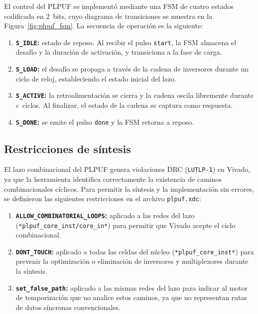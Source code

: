 El control del PLPUF se implementó mediante una FSM de cuatro estados
codificada en 2~bits, cuyo diagrama de transiciones se muestra en la
Figura~\ref{fig:plpuf_fsm}. La secuencia de operación es la siguiente:

\begin{enumerate}
  \item \textbf{\texttt{S\_IDLE}:} estado de reposo. Al recibir el pulso
    \texttt{start}, la FSM almacena el desafío y la duración de activación, y
    transiciona a la fase de carga.

  \item \textbf{\texttt{S\_LOAD}:} el desafío se propaga a través de la
    cadena de inversores durante un ciclo de reloj, estableciendo el estado
    inicial del lazo.

  \item \textbf{\texttt{S\_ACTIVE}:} la retroalimentación se cierra y la
    cadena oscila libremente durante $c$~ciclos. Al finalizar, el estado de la
    cadena se captura como respuesta.

  \item \textbf{\texttt{S\_DONE}:} se emite el pulso \texttt{done} y la FSM
    retorna a reposo.
\end{enumerate}

\subsection{Restricciones de síntesis}
\label{sec:constraints}

El lazo combinacional del PLPUF genera violaciones DRC (\texttt{LUTLP-1}) en
Vivado, ya que la herramienta identifica correctamente la existencia de
caminos combinacionales cíclicos. Para permitir la síntesis y la
implementación sin errores, se definieron las siguientes restricciones en el
archivo \texttt{plpuf.xdc}:

\begin{enumerate}
  \item \textbf{\texttt{ALLOW\_COMBINATORIAL\_LOOPS}:} aplicado a las redes
    del lazo (\texttt{*plpuf\_core\_inst/core\_in*}) para permitir que Vivado
    acepte el ciclo combinacional.

  \item \textbf{\texttt{DONT\_TOUCH}:} aplicado a todas las celdas del
    núcleo (\texttt{*plpuf\_core\_inst*}) para prevenir la optimización o
    eliminación de inversores y multiplexores durante la síntesis.

  \item \textbf{\texttt{set\_false\_path}:} aplicado a las mismas redes del
    lazo para indicar al motor de temporización que no analice estos caminos,
    ya que no representan rutas de datos síncronas convencionales.
\end{enumerate}

